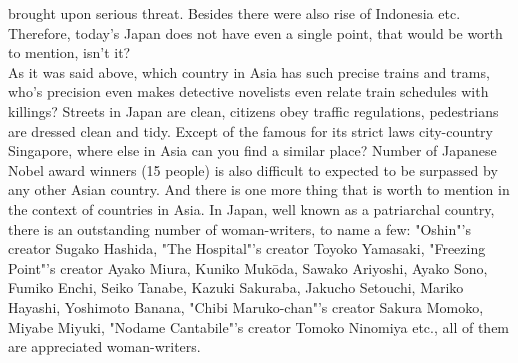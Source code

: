 \documentclass[11pt]{book}
\begin{document}
brought upon serious threat. Besides there were also rise of Indonesia etc. Therefore, today's Japan does not have even a single point, that would
be worth to mention, isn't it?\\
As it was said above, which country in Asia has such precise trains and trams, who's precision even makes detective novelists even relate train
schedules with killings? Streets in Japan are clean, citizens obey traffic regulations, pedestrians are dressed clean and tidy. Except of the famous
for its strict laws city-country Singapore, where else in Asia can you find a similar place? Number of Japanese Nobel award winners (15 people)
is also difficult to expected to be surpassed by any other Asian country. And there is one more thing that is worth to mention in the context
of countries in Asia. In Japan, well known as a patriarchal country, there is an outstanding number of woman-writers, to name a few: "Oshin"'s 
creator Sugako Hashida, "The Hospital"'s creator Toyoko Yamasaki, "Freezing Point"'s creator Ayako Miura, Kuniko Muk\=oda, Sawako Ariyoshi,
Ayako Sono, Fumiko Enchi, Seiko Tanabe, Kazuki Sakuraba, Jakucho Setouchi, Mariko Hayashi, Yoshimoto Banana, "Chibi Maruko-chan"'s creator
Sakura Momoko, Miyabe Miyuki, "Nodame Cantabile"'s creator Tomoko Ninomiya etc., all of them are appreciated woman-writers.
\end{document}
